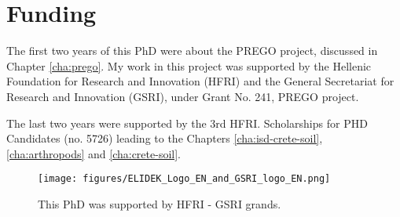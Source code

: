 \documentclass[
11pt, %
english, %
singlespacing, %
liststotoc, %
toctotoc, %
headsepline, %
]{MastersDoctoralThesis} %
\begin{document}
\chapter*{Funding}

The first two years of this PhD were about the PREGO project, discussed in Chapter \ref{cha:prego}. My work in this 
project was supported by the Hellenic Foundation for Research and
Innovation (HFRI) and the General Secretariat for Research and Innovation (GSRI),
under Grant No. 241, PREGO project.

The last two years were supported by the 3rd HFRI. Scholarships for PHD
Candidates (no. 5726) leading to the Chapters \ref{cha:isd-crete-soil}, \ref{cha:arthropods} and \ref{cha:crete-soil}.

   \begin{figure}[h]
      \centering
      \texttt{[image: figures/ELIDEK\_Logo\_EN\_and\_GSRI\_logo\_EN.png]}
      \caption[HFRI and GSRI funding]{
          This PhD was supported by HFRI - GSRI grands. 
      }
      \label{fig:hfri_logo}
   \end{figure}



\tableofcontents %

\listoffigures %

\listoftables %

\end{document}
